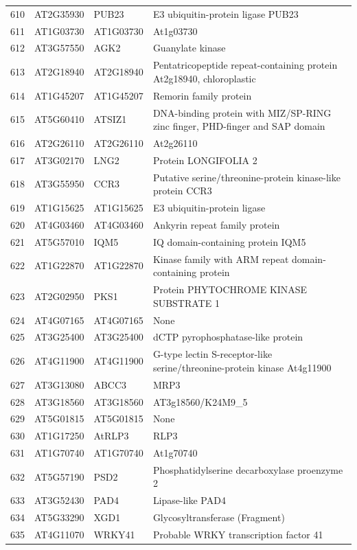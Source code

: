 \documentclass[11pt]{article}
\begin{document}
\begin{center}
\begin{tabular}{rlll}
610 & AT2G35930 & PUB23 & E3 ubiquitin-protein ligase PUB23\\
611 & AT1G03730 & AT1G03730 & At1g03730\\
612 & AT3G57550 & AGK2 & Guanylate kinase\\
613 & AT2G18940 & AT2G18940 & Pentatricopeptide repeat-containing protein At2g18940, chloroplastic\\
614 & AT1G45207 & AT1G45207 & Remorin family protein\\
615 & AT5G60410 & ATSIZ1 & DNA-binding protein with MIZ/SP-RING zinc finger, PHD-finger and SAP domain\\
616 & AT2G26110 & AT2G26110 & At2g26110\\
617 & AT3G02170 & LNG2 & Protein LONGIFOLIA 2\\
618 & AT3G55950 & CCR3 & Putative serine/threonine-protein kinase-like protein CCR3\\
619 & AT1G15625 & AT1G15625 & E3 ubiquitin-protein ligase\\
620 & AT4G03460 & AT4G03460 & Ankyrin repeat family protein\\
621 & AT5G57010 & IQM5 & IQ domain-containing protein IQM5\\
622 & AT1G22870 & AT1G22870 & Kinase family with ARM repeat domain-containing protein\\
623 & AT2G02950 & PKS1 & Protein PHYTOCHROME KINASE SUBSTRATE 1\\
624 & AT4G07165 & AT4G07165 & None\\
625 & AT3G25400 & AT3G25400 & dCTP pyrophosphatase-like protein\\
626 & AT4G11900 & AT4G11900 & G-type lectin S-receptor-like serine/threonine-protein kinase At4g11900\\
627 & AT3G13080 & ABCC3 & MRP3\\
628 & AT3G18560 & AT3G18560 & AT3g18560/K24M9\_5\\
629 & AT5G01815 & AT5G01815 & None\\
630 & AT1G17250 & AtRLP3 & RLP3\\
631 & AT1G70740 & AT1G70740 & At1g70740\\
632 & AT5G57190 & PSD2 & Phosphatidylserine decarboxylase proenzyme 2\\
633 & AT3G52430 & PAD4 & Lipase-like PAD4\\
634 & AT5G33290 & XGD1 & Glycosyltransferase (Fragment)\\
635 & AT4G11070 & WRKY41 & Probable WRKY transcription factor 41\\

\end{tabular}
\end{center}
\end{document}

